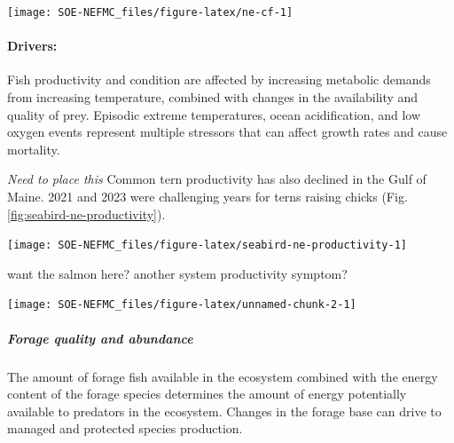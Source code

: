 \documentclass[
  10pt,
]{article}
\let\origfigure\figure
\let\endorigfigure\endfigure
\renewenvironment{figure}[1][2] {
    \expandafter\origfigure\expandafter[H]
} {
    \endorigfigure
}
\begin{document}
\begin{figure}

{\centering \texttt{[image: SOE-NEFMC\_files/figure-latex/ne-cf-1]} 

}

\caption{Condition factor for fish species in New England based on fall NEFSC bottom trawl survey data. No survey was conducted in 2020.}\label{fig:ne-cf}
\end{figure}

\hypertarget{drivers-2}{%
\paragraph{Drivers:}\label{drivers-2}}

Fish productivity and condition are affected by increasing metabolic demands from increasing temperature, combined with changes in the availability and quality of prey. Episodic extreme temperatures, ocean acidification, and low oxygen events represent multiple stressors that can affect growth rates and cause mortality.

\emph{Need to place this} Common tern productivity has also declined in the Gulf of Maine. 2021 and 2023 were challenging years for terns raising chicks (Fig. \ref{fig:seabird-ne-productivity}).

\begin{figure}

{\centering \texttt{[image: SOE-NEFMC\_files/figure-latex/seabird-ne-productivity-1]} 

}

\caption{Productivity of Common terns in the Gulf of Maine.}\label{fig:seabird-ne-productivity}
\end{figure}

want the salmon here? another system productivity symptom?

\begin{center}\texttt{[image: SOE-NEFMC\_files/figure-latex/unnamed-chunk-2-1]} \end{center}

\hypertarget{forage-quality-and-abundance}{%
\subparagraph{Forage quality and abundance}\label{forage-quality-and-abundance}}

The amount of forage fish available in the ecosystem combined with the energy content of the forage species determines the amount of energy potentially available to predators in the ecosystem. Changes in the forage base can drive to managed and protected species production.
\end{document}
